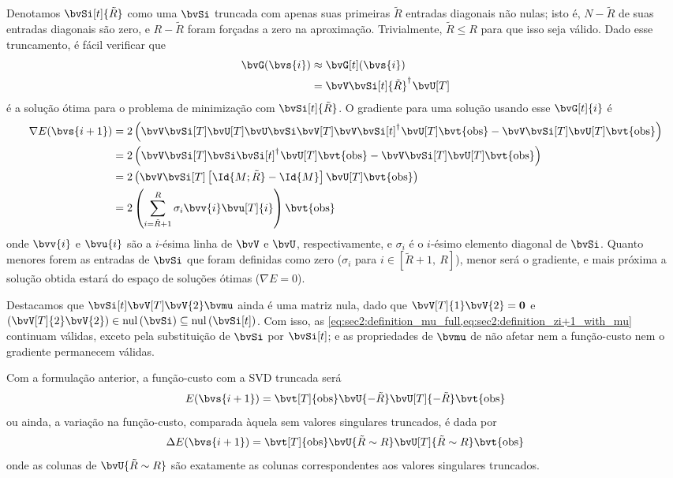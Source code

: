 Denotamos $\bvSi[t]{\tilde{R}}$ como uma $\bvSi$ truncada com apenas suas primeiras $\tilde{R}$ entradas diagonais não nulas; isto é, $N-\tilde{R}$ de suas entradas diagonais são zero, e $R-\tilde{R}$ foram forçadas a zero na aproximação. Trivialmente, $\tilde{R} \leq R$ para que isso seja válido. Dado esse truncamento, é fácil verificar que
\begin{equation}
	\begin{split}
		\bvG(\bvs{i}) & \approx \bvG[t](\bvs{i}) \\
		& = \bvV \pinv{\bvSi[t]{\tilde{R}}} \bvU[T]
	\end{split}
\end{equation}
é a solução ótima para o problema de minimização com $\bvSi[t]{\tilde{R}}$. O gradiente para uma solução usando esse $\bvG[t]{i}$ é
\begin{equation}
	\begin{split}
		\nabla E(\bvs{i+1})
		& = 2\pts{\bvV \bvSi[T] \bvU[T] \bvU \bvSi \bvV[T] \bvV \pinv{\bvSi[t]} \bvU[T] \bvt{\obs} - \bvV \bvSi[T] \bvU[T] \bvt{\obs}} \\
		& = 2\pts{\bvV \bvSi[T] \bvSi \pinv{\bvSi[t]} \bvU[T] \bvt{\obs} - \bvV \bvSi[T] \bvU[T] \bvt{\obs}} \\
		& = 2\pts{\bvV \bvSi[T] \bts{\Id{M;\tilde{R}} - \Id{M}} \bvU[T] \bvt{\obs}} \\
		& = 2\pts{\sum_{i=\tilde{R}+1}^{R} \sigma_i \bvv{i} \bvu[T]{i}} \bvt{\obs}
	\end{split}
\end{equation}
onde $\bvv{i}$ e $\bvu{i}$ são a $i$-ésima linha de $\bvV$ e $\bvU$, respectivamente, e $\sigma_i$ é o $i$-ésimo elemento diagonal de $\bvSi$. Quanto menores forem as entradas de $\bvSi$ que foram definidas como zero ($\sigma_i$ para $i \in [\tilde{R}+1,~R]$), menor será o gradiente, e mais próxima a solução obtida estará do espaço de soluções ótimas ($\nabla E = 0$).

Destacamos que $\bvSi[t] \bvV[T] \bvV{2} \bvmu$ ainda é uma matriz nula, dado que $\bvV[T]{1} \bvV{2} = \bv0$ e $\pts{\bvV[T]{2} \bvV{2}} \in \nul{\bvSi} \subseteq \nul{\bvSi[t]}$. Com isso, as \cref{eq:sec2:definition_mu_full,eq:sec2:definition_zi+1_with_mu} continuam válidas, exceto pela substituição de ${\bvSi}$ por ${\bvSi[t]}$; e as propriedades de $\bvmu$ de não afetar nem a função-custo nem o gradiente permanecem válidas.

Com a formulação anterior, a função-custo com a SVD truncada será
\begin{equation}
	E(\bvs{i+1}) = \bvt[T]{\obs} \bvU{-\tilde{R}} \bvU[T]{-\tilde{R}} \bvt{\obs}
\end{equation}
ou ainda, a variação na função-custo, comparada àquela sem valores singulares truncados, é dada por
\begin{equation}
	\Delta E(\bvs{i+1}) = \bvt[T]{\obs}  \bvU{\tilde{R}\sim R} \bvU[T]{\tilde{R}\sim R} \bvt{\obs}
\end{equation}
onde as colunas de $\bvU{\tilde{R} \sim R}$ são exatamente as colunas correspondentes aos valores singulares truncados.

